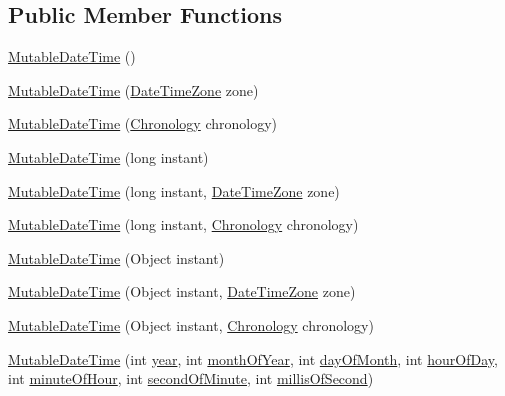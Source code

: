 \subsection*{Public Member Functions}
\begin{DoxyCompactItemize}
\item 
\hyperlink{classorg_1_1joda_1_1time_1_1_mutable_date_time_a3c9da9482086afd25cab6bc27c72d798}{Mutable\-Date\-Time} ()
\item 
\hyperlink{classorg_1_1joda_1_1time_1_1_mutable_date_time_a91d3dadfc064c98930b80e85836ccbdf}{Mutable\-Date\-Time} (\hyperlink{classorg_1_1joda_1_1time_1_1_date_time_zone}{Date\-Time\-Zone} zone)
\item 
\hyperlink{classorg_1_1joda_1_1time_1_1_mutable_date_time_a637c337fd056d28be6e5fbadee5e5893}{Mutable\-Date\-Time} (\hyperlink{classorg_1_1joda_1_1time_1_1_chronology}{Chronology} chronology)
\item 
\hyperlink{classorg_1_1joda_1_1time_1_1_mutable_date_time_a276c22a265dac6b7051cdc17ed210ddb}{Mutable\-Date\-Time} (long instant)
\item 
\hyperlink{classorg_1_1joda_1_1time_1_1_mutable_date_time_a973672a0612e6df9dbf40d7736993201}{Mutable\-Date\-Time} (long instant, \hyperlink{classorg_1_1joda_1_1time_1_1_date_time_zone}{Date\-Time\-Zone} zone)
\item 
\hyperlink{classorg_1_1joda_1_1time_1_1_mutable_date_time_a8d63c9d071b8bc18bdbedd326265256a}{Mutable\-Date\-Time} (long instant, \hyperlink{classorg_1_1joda_1_1time_1_1_chronology}{Chronology} chronology)
\item 
\hyperlink{classorg_1_1joda_1_1time_1_1_mutable_date_time_a1c8481369cae949204f500889a01bca3}{Mutable\-Date\-Time} (Object instant)
\item 
\hyperlink{classorg_1_1joda_1_1time_1_1_mutable_date_time_af7a7a9867ccc90fc3ac8a8146f20d084}{Mutable\-Date\-Time} (Object instant, \hyperlink{classorg_1_1joda_1_1time_1_1_date_time_zone}{Date\-Time\-Zone} zone)
\item 
\hyperlink{classorg_1_1joda_1_1time_1_1_mutable_date_time_a4e9d3752e09d14c6f3b581a7b1bb4261}{Mutable\-Date\-Time} (Object instant, \hyperlink{classorg_1_1joda_1_1time_1_1_chronology}{Chronology} chronology)
\item 
\hyperlink{classorg_1_1joda_1_1time_1_1_mutable_date_time_a28c61a57a6b28967531f1b6182db19b6}{Mutable\-Date\-Time} (int \hyperlink{classorg_1_1joda_1_1time_1_1_mutable_date_time_a33fe2fd92704573cfd1e0659cf26e0ae}{year}, int \hyperlink{classorg_1_1joda_1_1time_1_1_mutable_date_time_a58a879bcc13ad752006977b73ccb01eb}{month\-Of\-Year}, int \hyperlink{classorg_1_1joda_1_1time_1_1_mutable_date_time_a856f4c6ce8050846d320a4b88d7adcf4}{day\-Of\-Month}, int \hyperlink{classorg_1_1joda_1_1time_1_1_mutable_date_time_a3bfaaca097843a8d526d12c03e1b53e2}{hour\-Of\-Day}, int \hyperlink{classorg_1_1joda_1_1time_1_1_mutable_date_time_a30eda212c65711fde6149019836caebb}{minute\-Of\-Hour}, int \hyperlink{classorg_1_1joda_1_1time_1_1_mutable_date_time_a2b00888de5a6e8cab5662bfe0ae4e9a9}{second\-Of\-Minute}, int \hyperlink{classorg_1_1joda_1_1time_1_1_mutable_date_time_ac42752b6540827c2426fa9b5c48b0775}{millis\-Of\-Second})

\end{DoxyCompactItemize}

